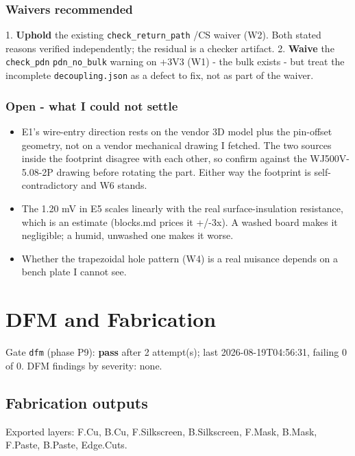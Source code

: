 \documentclass[11pt,a4paper]{article}
\begin{document}
\subsubsection*{Waivers recommended}
1. \textbf{Uphold} the existing \texttt{check\_return\_path} /CS waiver (W2). Both stated reasons verified independently; the residual is a checker artifact. 2. \textbf{Waive} the \texttt{check\_pdn} \texttt{pdn\_no\_bulk} warning on +3V3 (W1) - the bulk exists - but treat the incomplete \texttt{decoupling.json} as a defect to fix, not as part of the waiver.

\subsubsection*{Open - what I could not settle}
\begin{itemize}
\item E1's wire-entry direction rests on the vendor 3D model plus the pin-offset
geometry, not on a vendor mechanical drawing I fetched. The two sources
inside the footprint disagree with each other, so confirm against the
WJ500V-5.08-2P drawing before rotating the part. Either way the footprint is
self-contradictory and W6 stands.
\item The 1.20 mV in E5 scales linearly with the real surface-insulation
resistance, which is an estimate (blocks.md prices it +/-3x). A washed board
makes it negligible; a humid, unwashed one makes it worse.
\item Whether the trapezoidal hole pattern (W4) is a real nuisance depends on a
bench plate I cannot see.
\end{itemize}
\section{DFM and Fabrication}
Gate \texttt{dfm} (phase P9): \textbf{pass} after 2 attempt(s); last 2026-08-19T04:56:31, failing 0 of 0.
DFM findings by severity: none.
\subsection*{Fabrication outputs}
Exported layers: F.Cu, B.Cu, F.Silkscreen, B.Silkscreen, F.Mask, B.Mask, F.Paste, B.Paste, Edge.Cuts.
\end{document}

